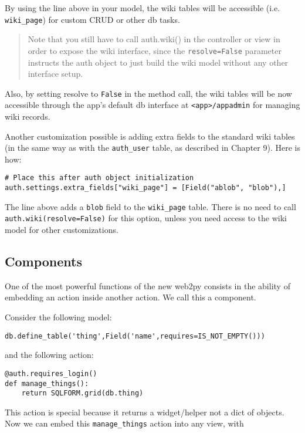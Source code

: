 \documentclass[justified,sixbynine,notoc]{tufte-book}
\def\ft{\small\tt}
\begin{document}
\begin{fullwidth}
By using the line above in your model, the wiki tables will be accessible (i.e. {\ft wiki\_page}) for custom CRUD or other db tasks.

\begin{quote}Note that you still have to call auth.wiki() in the controller or view in order to expose the wiki interface, since the {\ft resolve=False} parameter instructs the auth object to just build the wiki model without any other interface setup.\end{quote}
Also, by setting resolve to {\ft False} in the method call, the wiki tables will be now accessible through the app's default db interface at {\ft <app>/appadmin} for managing wiki records.

Another customization possible is adding extra fields to the standard wiki tables (in the same way as with the {\ft auth\_user} table, as described in Chapter 9). Here is how:

\begin{lstlisting}
# Place this after auth object initialization
auth.settings.extra_fields["wiki_page"] = [Field("ablob", "blob"),]
\end{lstlisting}

The line above adds a {\ft blob} field to the {\ft wiki\_page} table. There is no need to call {\ft auth.wiki(resolve=False)} for this option, unless you need access to the wiki model for other customizations.

\goodbreak\subsection{Components}

One of the most powerful functions of the new web2py consists in the ability of embedding an action inside another action. We call this a component.

Consider the following model:

\begin{lstlisting}
db.define_table('thing',Field('name',requires=IS_NOT_EMPTY()))
\end{lstlisting}
\noindent and the following action:

\begin{lstlisting}
@auth.requires_login()
def manage_things():
    return SQLFORM.grid(db.thing)
\end{lstlisting}

This action is special because it returns a widget/helper not a dict of objects. Now we can embed this {\ft manage\_things} action into any view, with


\end{fullwidth}
\end{document}
